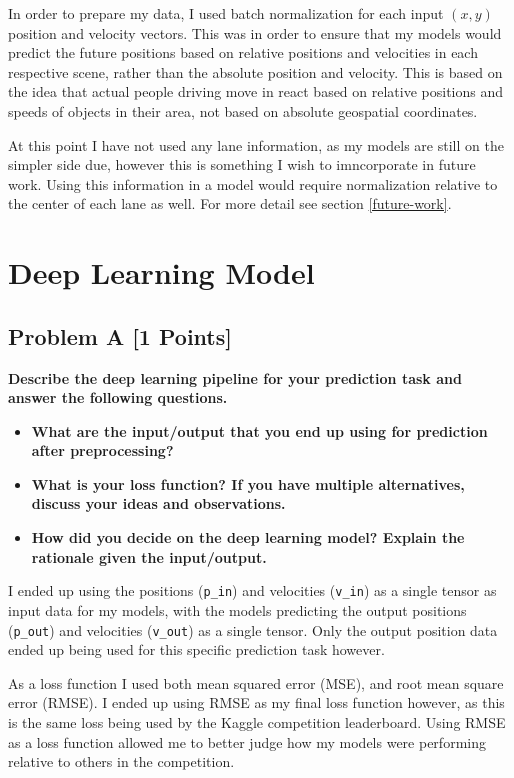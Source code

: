 \documentclass{article}
\begin{document}
      In order to prepare my data, I used batch normalization for each input $(x,y)$ position and velocity vectors.
      This was in order to ensure that my models would predict the future positions based on relative positions and velocities
      in each respective scene, rather than the absolute position and velocity. This is based on the idea that actual people driving
      move in react based on relative positions and speeds of objects in their area, not based on absolute geospatial coordinates.

      At this point I have not used any lane information, as my models are still on the simpler side due, however this is something
      I wish to imncorporate in future work. Using this information in a model would require normalization relative to the 
      center of each lane as well. For more detail see section \ref{future-work}.

  \section{Deep Learning Model}
    \subsection{Problem A [1 Points]}
      \textbf{Describe the deep learning pipeline for your prediction task and
      answer the following questions.}

      \begin{itemize}
        \item \textbf{What are the input/output that you end up using for prediction after preprocessing?}
        \item \textbf{What is your loss function? If you have multiple alternatives, discuss your ideas
        and observations.}
        \item \textbf{How did you decide on the deep learning model? Explain the rationale given the
        input/output.}
      \end{itemize}

      I ended up using the positions (\texttt{p\_in}) and velocities (\texttt{v\_in}) as a single tensor as input data for my models, with 
      the models predicting the output positions (\texttt{p\_out}) and velocities (\texttt{v\_out}) as a single tensor. 
      Only the output position data ended up being used for this specific prediction task however. 
      
      As a loss function I used both mean squared error (MSE), and root mean square error (RMSE). I ended up using RMSE as my 
      final loss function however, as this is the 
      same loss being used by the Kaggle competition leaderboard. Using RMSE as a loss function allowed me to better judge how my 
      models were performing relative to others in the competition.
\end{document}

